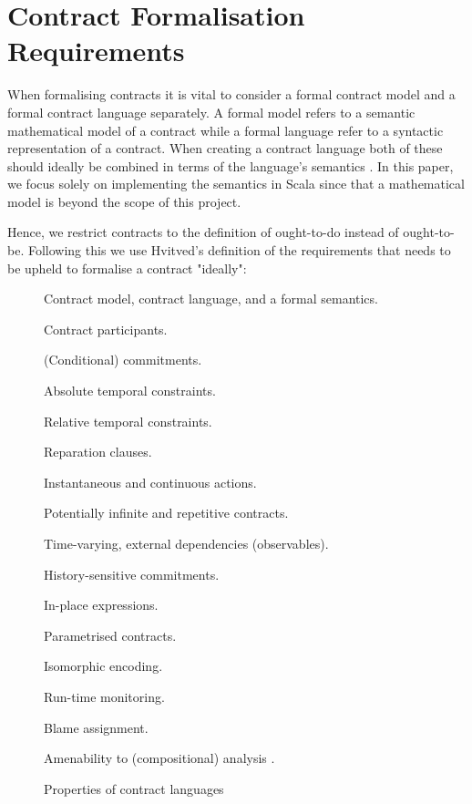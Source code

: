 \documentclass{ituthesis}
\begin{document}
\section{Contract Formalisation Requirements} \label{requirements}
When formalising contracts it is vital to consider a formal contract model and a formal contract language separately. A formal model refers to a semantic mathematical model of a contract while a formal language refer to a syntactic representation of a contract. When creating a contract language both of these should ideally be combined in terms of the language's semantics \cite{hvitved2011contract}. In this paper, we focus solely on implementing the semantics in Scala since that a mathematical model is beyond the scope of this project.

Hence, we restrict contracts to the definition of ought-to-do instead of ought-to-be. Following this we use Hvitved's definition of the requirements that needs to be upheld to formalise a contract "ideally":


\begin{figure}[!h]
\begin{tcolorbox}[fontupper=\small]
\begin{list}{R:~}{}
    \item Contract model, contract language, and a formal semantics.
    \item Contract participants.
    \item (Conditional) commitments.
    \item Absolute temporal constraints.
    \item Relative temporal constraints.
    \item Reparation clauses.
    \item Instantaneous and continuous actions.
    \item Potentially infinite and repetitive contracts.
    \item Time-varying, external dependencies (observables).
    \item History-sensitive commitments.
    \item In-place expressions.
    \item Parametrised contracts.
    \item Isomorphic encoding.
    \item Run-time monitoring.
    \item Blame assignment.
    \item Amenability to (compositional) analysis \cite{hvitved2011contract}.
\end{list}
\end{tcolorbox}
\caption{Properties of contract languages}
\label{fig:properties}
\end{figure}
\end{document}
